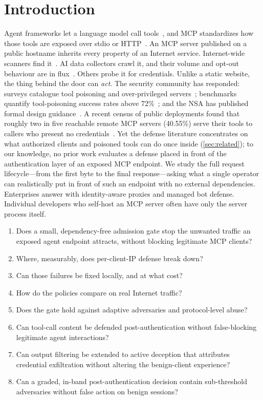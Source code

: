 \documentclass[10pt,twocolumn]{article}
\begin{document}
\section{Introduction}
Agent frameworks let a language model call tools~\citep{yao2023react,schick2023toolformer,patil2023gorilla},
and MCP standardizes how those tools are exposed over stdio or HTTP~\citep{mcpspec}.
An MCP server published on a public hostname inherits every property of an
Internet service. Internet-wide scanners find it~\citep{durumeric2013zmap}. AI
data collectors crawl it, and their volume and opt-out behaviour are in
flux~\citep{longpre2024consent,rfc9309}. Others probe it for credentials. Unlike
a static website, the thing behind the door can \emph{act}. The security
community has responded: surveys catalogue tool poisoning and over-privileged
servers~\citep{hou2025mcp,owaspllm2025}; benchmarks quantify tool-poisoning
success rates above 72\%~\citep{mcptox2025}; and the NSA has published formal
design guidance~\citep{nsamcp2026}. A recent census of public deployments
found that roughly two in five reachable remote MCP servers (40.55\%) serve
their tools to callers who present no credentials~\citep{zhou2026mcpauth}. Yet the defense literature
concentrates on what authorized clients and poisoned tools can do once inside
(\cref{sec:related}); to our knowledge, no prior work evaluates a defense
placed in front of the authentication layer of an exposed MCP endpoint. We study the full request lifecycle---from the first byte to the
final response---asking what a single operator can realistically put in
front of such an endpoint with no external dependencies.
Enterprises answer with identity-aware proxies and managed bot defense.
Individual developers who self-host an MCP server often have only the server
process itself.

\begin{enumerate}
  \item[\textbf{RQ1}] Does a small, dependency-free admission gate stop the
        unwanted traffic an exposed agent endpoint attracts, without blocking
        legitimate MCP clients?
  \item[\textbf{RQ2}] Where, measurably, does per-client-IP defense break down?
  \item[\textbf{RQ3}] Can those failures be fixed locally, and at what cost?
  \item[\textbf{RQ4}] How do the policies compare on real Internet traffic?
  \item[\textbf{RQ5}] Does the gate hold against adaptive adversaries and
        protocol-level abuse?
  \item[\textbf{RQ6}] Can tool-call content be defended post-authentication
        without false-blocking legitimate agent interactions?
  \item[\textbf{RQ7}] Can output filtering be extended to active deception
        that attributes credential exfiltration without altering the
        benign-client experience?
  \item[\textbf{RQ8}] Can a graded, in-band post-authentication decision
        contain sub-threshold adversaries without false action on benign
        sessions?
\end{enumerate}
\end{document}
